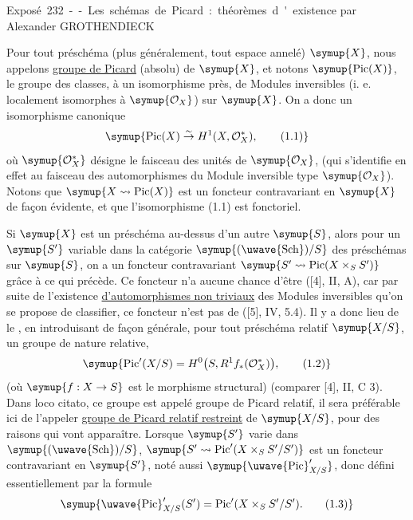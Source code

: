 \unit{Exposé 232 -- Les schémas de Picard : théorèmes d'existence}
%
  {par Alexander GROTHENDIECK}


Pour tout préschéma (plus généralement, tout espace annelé) $\symup{X}$, nous appelons
\uline{groupe de Picard} (absolu) de $\symup{X}$, et notons $\symup{\operatorname{Pic}(X)}$, le
groupe des classes, à un isomorphisme près, de Modules inversibles (i. e.
localement isomorphes à $\symup{\mathcal O_X}$) sur $\symup{X}$. On a donc un isomorphisme
canonique
\begin{equation}
\symup{\operatorname{Pic}(X)\overset{\sim}{\to}H^1(X,\mathcal O_X^*),
\tag{1.1}}
\end{equation}
où $\symup{\mathcal O_X^*}$ désigne le faisceau des unités de $\symup{\mathcal O_X}$, (qui
s'identifie en effet au faisceau des automorphismes du Module inversible type
$\symup{\mathcal O_X}$). Notons que $\symup{X\rightsquigarrow\operatorname{Pic}(X)}$ est un foncteur
contravariant en $\symup{X}$ de façon évidente, et que l'isomorphisme (1.1) est
fonctoriel.

Si $\symup{X}$ est un préschéma au-dessus d'un autre $\symup{S}$, alors pour un $\symup{S'}$ variable
dans la catégorie $\symup{(\text{\uwave{Sch}})/S}$ des préschémas sur $\symup{S}$, on a un foncteur
contravariant $\symup{S'\rightsquigarrow\operatorname{Pic}(X\times_S S')}$ grâce à ce qui
précède. Ce foncteur n'a aucune chance d'être  ([4], II, A),
car par suite de l'existence \uline{d'automorphismes non triviaux} des Modules
inversibles qu'on se propose de classifier, ce foncteur n'est pas de  ([5], IV, 5.4). Il y a donc lieu de le , en introduisant
de façon générale, pour tout préschéma relatif $\symup{X/S}$, un groupe de nature
relative,
\begin{equation}
\symup{\operatorname{Pic}'(X/S)=H^0\bigl(S,R^1f_*(\mathcal O_X^*)\bigr),
\tag{1.2}}
\end{equation}
(où $\symup{f:X\to S}$ est le morphisme structural) (comparer [4], II,
C 3). Dans loco citato, ce groupe est appelé groupe de Picard relatif, il sera
préférable ici de l'appeler \uline{groupe de Picard relatif restreint} de $\symup{X/S}$,
pour des raisons qui vont apparaître. Lorsque $\symup{S'}$ varie dans $\symup{(\text{\uwave{Sch}})/S}$,
$\symup{S'\rightsquigarrow\operatorname{Pic}'(X\times_S S'/S')}$ est un foncteur
contravariant en $\symup{S'}$, noté aussi $\symup{\mathop{\text{\uwave{Pic}}}\nolimits'_{X/S}}$, donc défini
essentiellement par la formule
\begin{equation}
\symup{\mathop{\text{\uwave{Pic}}}\nolimits'_{X/S}(S')=
\operatorname{Pic}'(X\times_S S'/S').
\tag{1.3}}
\end{equation}

